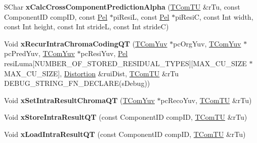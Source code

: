 \begin{DoxyCompactItemize}
\item 
\mbox{\label{class_t_enc_search_a5217e637ee0f8fb96295087075dda414}} 
S\+Char {\bfseries x\+Calc\+Cross\+Component\+Prediction\+Alpha} (\hyperlink{class_t_com_t_u}{T\+Com\+TU} \&r\+Tu, const Component\+ID comp\+ID, const \hyperlink{_type_def_8h_af92141699657699b4b547be0c8517541}{Pel} $\ast$pi\+ResiL, const \hyperlink{_type_def_8h_af92141699657699b4b547be0c8517541}{Pel} $\ast$pi\+ResiC, const Int width, const Int height, const Int strideL, const Int strideC)
\item 
\mbox{\label{class_t_enc_search_a68e9c5677bca4bd92d39e2651d161d68}} 
Void {\bfseries x\+Recur\+Intra\+Chroma\+Coding\+QT} (\hyperlink{class_t_com_yuv}{T\+Com\+Yuv} $\ast$pc\+Org\+Yuv, \hyperlink{class_t_com_yuv}{T\+Com\+Yuv} $\ast$pc\+Pred\+Yuv, \hyperlink{class_t_com_yuv}{T\+Com\+Yuv} $\ast$pc\+Resi\+Yuv, \hyperlink{_type_def_8h_af92141699657699b4b547be0c8517541}{Pel} resi\+Luma\mbox{[}N\+U\+M\+B\+E\+R\+\_\+\+O\+F\+\_\+\+S\+T\+O\+R\+E\+D\+\_\+\+R\+E\+S\+I\+D\+U\+A\+L\+\_\+\+T\+Y\+P\+ES\mbox{]}\mbox{[}M\+A\+X\+\_\+\+C\+U\+\_\+\+S\+I\+ZE $\ast$M\+A\+X\+\_\+\+C\+U\+\_\+\+S\+I\+ZE\mbox{]}, \hyperlink{_type_def_8h_aed82b23ef6849d0bc3d95c92102d5b50}{Distortion} \&rui\+Dist, \hyperlink{class_t_com_t_u}{T\+Com\+TU} \&r\+Tu D\+E\+B\+U\+G\+\_\+\+S\+T\+R\+I\+N\+G\+\_\+\+F\+N\+\_\+\+D\+E\+C\+L\+A\+RE(s\+Debug))
\item 
\mbox{\label{class_t_enc_search_a5f60d7d055017f6d58164138fbad7320}} 
Void {\bfseries x\+Set\+Intra\+Result\+Chroma\+QT} (\hyperlink{class_t_com_yuv}{T\+Com\+Yuv} $\ast$pc\+Reco\+Yuv, \hyperlink{class_t_com_t_u}{T\+Com\+TU} \&r\+Tu)
\item 
\mbox{\label{class_t_enc_search_a38d909901427f6b78b90a41d7325c11b}} 
Void {\bfseries x\+Store\+Intra\+Result\+QT} (const Component\+ID comp\+ID, \hyperlink{class_t_com_t_u}{T\+Com\+TU} \&r\+Tu)
\item 
\mbox{\label{class_t_enc_search_ab9f4b43285cbd256457a71391d7d04d3}} 
Void {\bfseries x\+Load\+Intra\+Result\+QT} (const Component\+ID comp\+ID, \hyperlink{class_t_com_t_u}{T\+Com\+TU} \&r\+Tu)
\item 
\mbox{\label{class_t_enc_search_a789df6ca7868aebac2cfef4a18c0085b}} 

\end{DoxyCompactItemize}
